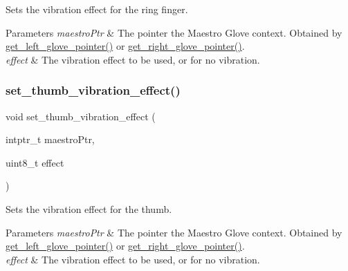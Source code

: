 Sets the vibration effect for the ring finger. 
\begin{DoxyParams}{Parameters}
{\em maestro\+Ptr} & The pointer the Maestro Glove context. Obtained by \hyperlink{group__glove_context_access_ga63ce3c99d4a8b8db851b22af9185764e}{get\+\_\+left\+\_\+glove\+\_\+pointer()} or \hyperlink{group__glove_context_access_ga9b8fd9d91aeac3f8da50f7a7eba0c32b}{get\+\_\+right\+\_\+glove\+\_\+pointer()}. \\
\hline
{\em effect} & The vibration effect to be used, or {} for no vibration. \\
\hline
\end{DoxyParams}
\mbox{\label{group__strong_ga2cade8fb792cc25e14176898ba9b70d5}} 
\subsubsection{\texorpdfstring{set\+\_\+thumb\+\_\+vibration\+\_\+effect()}{set\_thumb\_vibration\_effect()}}
{\footnotesize\ttfamily void set\+\_\+thumb\+\_\+vibration\+\_\+effect (\begin{DoxyParamCaption}\item[{intptr\+\_\+t}]{maestro\+Ptr,  }\item[{uint8\+\_\+t}]{effect }\end{DoxyParamCaption})}

Sets the vibration effect for the thumb. 
\begin{DoxyParams}{Parameters}
{\em maestro\+Ptr} & The pointer the Maestro Glove context. Obtained by \hyperlink{group__glove_context_access_ga63ce3c99d4a8b8db851b22af9185764e}{get\+\_\+left\+\_\+glove\+\_\+pointer()} or \hyperlink{group__glove_context_access_ga9b8fd9d91aeac3f8da50f7a7eba0c32b}{get\+\_\+right\+\_\+glove\+\_\+pointer()}. \\
\hline
{\em effect} & The vibration effect to be used, or {} for no vibration. \\
\hline
\end{DoxyParams}
